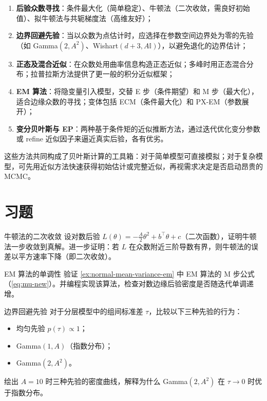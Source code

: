 \begin{enumerate}
\item \textbf{后验众数寻找}：条件最大化（简单稳定）、牛顿法（二次收敛，需良好初始值）、拟牛顿法与共轭梯度法（高维友好）；

\item \textbf{边界回避先验}：当以众数为点估计时，应选择在参数空间边界处为零的先验（如 Gamma$(2, A^2)$、Wishart$(d+3, A\mathbb{I})$），以避免退化的边界估计；

\item \textbf{正态及混合近似}：在众数处用曲率信息构造正态近似；多峰时用正态混合分布；拉普拉斯方法提供了更一般的积分近似框架；

\item \textbf{EM 算法}：将隐变量引入模型，交替 E 步（条件期望）和 M 步（最大化），适合边缘众数的寻找；变体包括 ECM（条件最大化）和 PX-EM（参数展开）；

\item \textbf{变分贝叶斯与 EP}：两种基于条件矩的近似推断方法，通过迭代优化变分参数或 refine 近似因子来逼近真实后验，各有优劣。
\end{enumerate}

这些方法共同构成了贝叶斯计算的工具箱：对于简单模型可直接模拟；对于复杂模型，可先用近似方法快速获得初始估计或完整近似，再视需求决定是否启动昂贵的 MCMC。

\section{习题}\label{sec:exercises-ch13}

\begin{Exercise}{牛顿法的二次收敛}\label{ex:newton-convergence}
设对数后验 $L(\theta) = -\frac{A}{2}\theta^2 + b^\top\theta + c$（二次函数），证明牛顿法一步收敛到真解。进一步证明：若 $L$ 在众数附近三阶导数有界，则牛顿法的误差以平方速率下降（即二次收敛）。
\end{Exercise}

\begin{Exercise}{EM 算法的单调性}\label{ex:em-monotonicity-exercise}
验证 \cref{ex:normal-mean-variance-em} 中 EM 算法的 M 步公式（\cref{eq:mu-new}）。并编程实现该算法，检查对数边缘后验密度是否随迭代单调递增。
\end{Exercise}

\begin{Exercise}{边界回避先验}\label{ex:boundary-prior}
对于分层模型中的组间标准差 $\tau$，比较以下三种先验的行为：
\begin{itemize}
\item 均匀先验 $p(\tau) \propto 1$；
\item Gamma$(1, A)$（指数分布）；
\item Gamma$(2, A^2)$。
\end{itemize}
绘出 $A = 10$ 时三种先验的密度曲线，解释为什么 Gamma$(2, A^2)$ 在 $\tau \to 0$ 时优于指数分布。
\end{Exercise}

